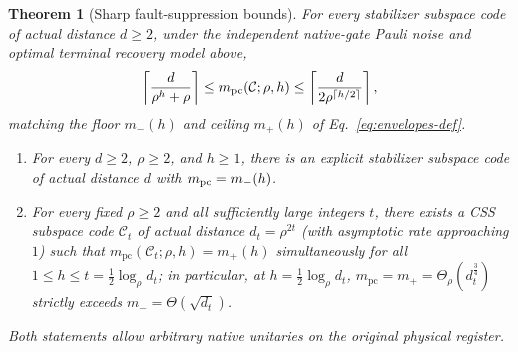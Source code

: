\documentclass[aps,prl,reprint,notitlepage,nofootinbib,nobibnotes]{revtex4-2}
\newtheorem{theorem}{Theorem}
\begin{document}
\begin{theorem}[Sharp fault-suppression bounds]\label{thm:fault-sharpness}
For every stabilizer subspace code of actual distance \(d\ge2\), under the independent native-gate Pauli noise and optimal terminal recovery model above,
\begin{equation}\label{eq:discussion-fixed-code-exponent}
 \left\lceil\frac{d}{\rho^h+\rho}\right\rceil
 \le m_{\rm pc}(\mathcal C;\rho,h)
 \le \left\lceil\frac{d}{2\rho^{\lceil h/2\rceil}}\right\rceil,
\end{equation}
matching the floor \(m_-(h)\) and ceiling \(m_+(h)\) of Eq.~\eqref{eq:envelopes-def}.
\begin{enumerate}
\item[(1)] For every \(d\ge2\), \(\rho\ge2\), and \(h\ge1\), there is an explicit stabilizer subspace code of actual distance \(d\) with \(m_{\rm pc}=m_-(h)\).
\item[(2)] For every fixed \(\rho\ge2\) and all sufficiently large integers \(t\), there exists a CSS subspace code \(\mathcal C_t\) of actual distance \(d_t=\rho^{2t}\) (with asymptotic rate approaching \(1\)) such that \(m_{\mathrm{pc}}(\mathcal C_t;\rho,h)=m_+(h)\) simultaneously for all \(1\le h\le t=\tfrac12\log_\rho d_t\); in particular, at \(h=\tfrac12\log_\rho d_t\), \(m_{\mathrm{pc}}=m_+=\Theta_\rho(d_t^{\frac34})\) strictly exceeds \(m_-=\Theta(\sqrt{d_t})\).
\end{enumerate}
Both statements allow arbitrary native unitaries on the original physical register.
\end{theorem}
\end{document}
